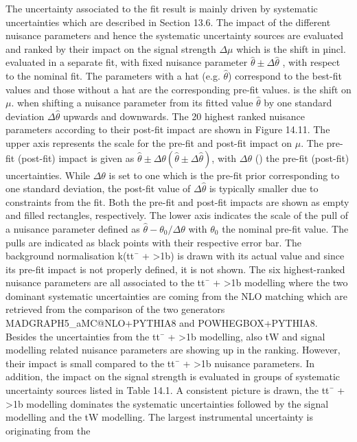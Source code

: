 The uncertainty associated to the fit result is mainly driven by systematic uncertainties which are
described in Section 13.6. The impact of the different nuisance parameters and hence the systematic
uncertainty sources are evaluated and ranked by their impact on the signal strength $\Delta\mu$ which is the
shift in µincl. evaluated in a separate fit, with fixed nuisance parameter $\hat{\theta} \pm \Delta\hat{\theta}$ , with respect to the nominal fit. The parameters with a hat (e.g. $\hat{\theta}$) correspond to the best-fit values and those without a hat are the corresponding pre-fit values. \Delta\hat{\theta} is the shift on $\mu$. when shifting a nuisance parameter from its fitted value $\hat{\theta}$ by one standard deviation $\Delta\hat{\theta}$ upwards and downwards. The 20 highest ranked nuisance parameters
according to their post-fit impact are shown in Figure 14.11. The upper axis represents the scale for
the pre-fit and post-fit impact on $\mu$. The pre-fit (post-fit) impact is given as $\hat{\theta} \pm \Delta\theta (\hat{\theta} \pm \Delta\hat{\theta})$, with $\Delta\theta$
(\Delta\hat{\theta}) the pre-fit (post-fit) uncertainties. While $\Delta\theta$ is set to one which is the pre-fit prior corresponding to one standard deviation, the post-fit value of $\Delta\hat{\theta}$ is typically smaller due to constraints from the fit. Both the pre-fit and post-fit impacts are shown as empty and filled rectangles, respectively. The lower axis indicates the scale of the pull of a nuisance parameter defined as $\hat{\theta} -\theta_0 / \Delta\theta$ with $\theta_0$ the nominal pre-fit value. The pulls are indicated as black points with their respective error bar. The background normalisation k(tt¯ + >1b) is drawn with its actual value and since its pre-fit impact is not properly defined,
it is not shown. The six highest-ranked nuisance parameters are all associated to the tt¯ + >1b modelling where the two dominant systematic uncertainties are coming from the NLO matching which
are retrieved from the comparison of the two generators MADGRAPH5_aMC@NLO+PYTHIA8 and
POWHEGBOX+PYTHIA8. Besides the uncertainties from the tt¯ + >1b modelling, also tW and
signal modelling related nuisance parameters are showing up in the ranking. However, their impact is small compared to the tt¯ + >1b nuisance parameters. In addition, the impact on the signal
strength is evaluated in groups of systematic uncertainty sources listed in Table 14.1. A consistent
picture is drawn, the tt¯ + >1b modelling dominates the systematic uncertainties followed by the
signal modelling and the tW modelling. The largest instrumental uncertainty is originating from the
